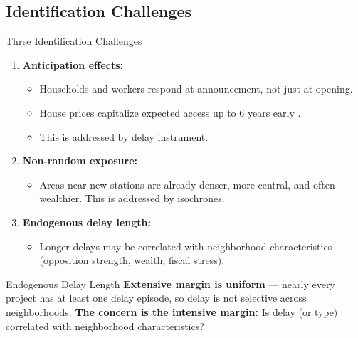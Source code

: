 \subsection{Identification Challenges}
\begin{frame}[label=challenges]{Three Identification Challenges}
\small
\begin{enumerate}
  \item \textbf{Anticipation effects:}
    \begin{itemize}
      \item Households and workers respond at announcement, not just at opening.
      \item House prices capitalize expected access up to 6 years early
            \parencite{mcmillenReactionHousePrices2004}.
      \item This is addressed by delay instrument.
    \end{itemize}
  \item \textbf{Non-random exposure:}
    \begin{itemize}
      \item Areas near new stations are already denser, more central, and often wealthier. This is addressed by isochrones.
    \end{itemize}
  \item \textbf{Endogenous delay length:}
    \begin{itemize}
      \item Longer delays may be correlated with neighborhood characteristics
            (opposition strength, wealth, fiscal stress).
    \end{itemize}
\end{enumerate}
\end{frame}
\begin{frame}[label=endogenous1]{Endogenous Delay Length}
\small
\textbf{Extensive margin is uniform} --- nearly every project has at least one
delay episode, so delay  is not selective across neighborhoods.
\bigskip
\textbf{The concern is the intensive margin:} Is delay  (or type)
correlated with neighborhood characteristics?
\end{frame}
